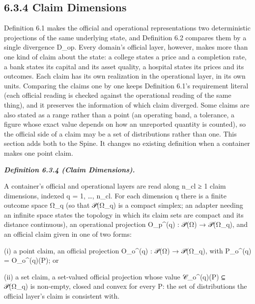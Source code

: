 \documentclass[
]{article}
\begin{document}
\hypertarget{claim-dimensions}{%
\subsection{6.3.4 Claim Dimensions}\label{claim-dimensions}}

Definition 6.1 makes the official and operational representations two
deterministic projections of the same underlying state, and Definition
6.2 compares them by a single divergence D\_op. Every domain's official
layer, however, makes more than one kind of claim about the state: a
college states a price and a completion rate, a bank states its capital
and its asset quality, a hospital states its prices and its outcomes.
Each claim has its own realization in the operational layer, in its own
units. Comparing the claims one by one keeps Definition 6.1's
requirement literal (each official reading is checked against the
operational reading of the same thing), and it preserves the information
of which claim diverged. Some claims are also stated as a range rather
than a point (an operating band, a tolerance, a figure whose exact value
depends on how an unreported quantity is counted), so the official side
of a claim may be a set of distributions rather than one. This section
adds both to the Spine. It changes no existing definition when a
container makes one point claim.

\emph{\textbf{Definition 6.3.4 (Claim Dimensions).}}

A container's official and operational layers are read along n\_cl ≥ 1
claim dimensions, indexed q = 1, \ldots, n\_cl. For each dimension q
there is a finite outcome space Ω\_q (so that 𝒫(Ω\_q) is a compact
simplex; an adapter needing an infinite space states the topology in
which its claim sets are compact and its distance continuous), an
operational projection O\_p\^{}(q) : 𝒫(Ω) → 𝒫(Ω\_q), and an official
claim given in one of two forms:

(i) a point claim, an official projection O\_o\^{}(q) : 𝒫(Ω) → 𝒫(Ω\_q),
with P\_o\^{}(q) = O\_o\^{}(q)(P); or

(ii) a set claim, a set-valued official projection whose value
𝒞\_o\^{}(q)(P) ⊆ 𝒫(Ω\_q) is non-empty, closed and convex for every P:
the set of distributions the official layer's claim is consistent with.
\end{document}
